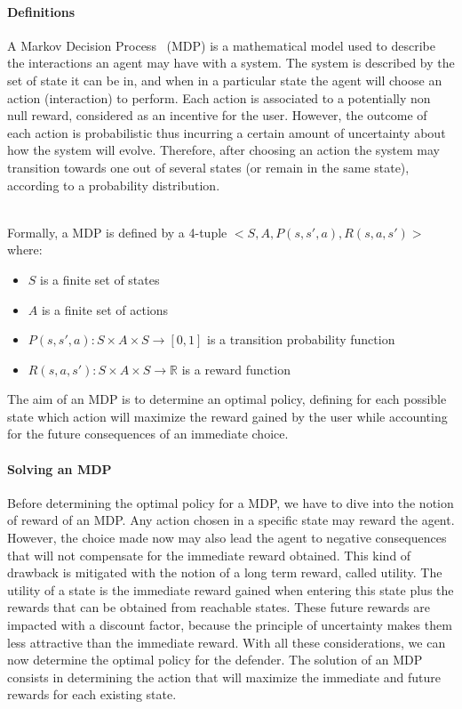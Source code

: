 \paragraph{Definitions}
A Markov Decision Process~\cite{bellman1957} (MDP) is a mathematical model used to describe the interactions  an agent may have with a system.
The system is described by the set of state it can be in, and when in a particular state the agent will choose an action (interaction) to perform.
Each action is associated to a potentially non null reward, considered as an incentive for the user.
However, the outcome of each action is probabilistic thus incurring a certain amount of uncertainty about how the system will evolve.
Therefore, after choosing an action the system may transition towards one out of several states (or remain in the same state), according to a probability distribution.



\textbf{\\}
Formally, a MDP is defined by a 4-tuple $<S,A,P(s,s',a),R(s,a,s')>$ where:
\begin{itemize}
    \item $S$ is a finite set of states
    \item $A$ is a finite set of actions
    \item $P(s,s',a) : S \times A \times S \longrightarrow [0,1]$ is a transition probability function
    \item $R(s,a,s') : S \times A \times S \longrightarrow \mathbb{R}$ is a reward function
\end{itemize}

The aim of an MDP is to determine an optimal policy, defining for each possible state which action will maximize the reward gained by the user while accounting for the future consequences of an immediate choice.


\paragraph{Solving an MDP}
\label{sec:optimalpolicy}
Before determining the optimal policy for a MDP, we have to dive into the notion of reward of an MDP. Any action chosen in a specific state may reward the agent. However, the choice made now may also lead the agent to negative consequences that will not compensate for the immediate reward obtained. 
This kind of drawback is mitigated with the notion of a long term reward, called utility. The utility of a state is the immediate reward gained when entering this state plus the rewards that can be obtained from reachable states.
These future rewards are impacted with a discount factor, because the principle of uncertainty makes them less attractive than the immediate reward.
With all these considerations, we can now determine the optimal policy for the defender.
The solution of an MDP consists in determining the action that will maximize the immediate and future rewards for each existing state.

